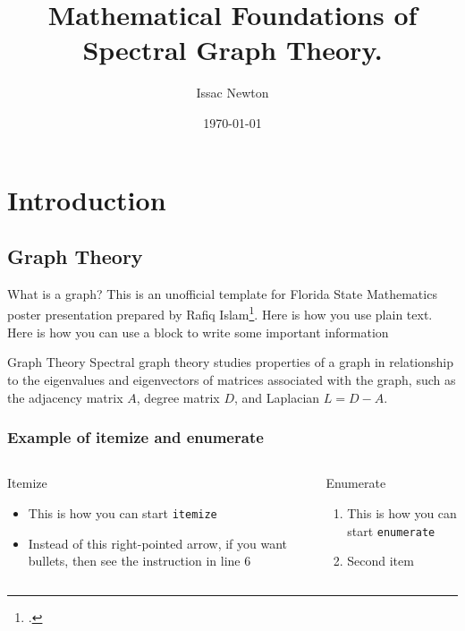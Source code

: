 \documentclass{ctexbeamer}
\title[A short version of the title goes here]{Mathematical Foundations of Spectral Graph Theory.}
\author[Newton]{Issac Newton}
\institute{Nanjing University}
\date{\today}
\begin{document}
\maketitle

\section{Introduction}
\subsection{Graph Theory}
\begin{frame}{What is a graph?}
    This is an unofficial template for Florida State Mathematics poster presentation prepared by Rafiq 
    Islam\footcite{fsumathposter25}. Here is how you use plain text. Here is how you can use a block to write some important information \cite{fsubeamerpresent25}
    \begin{block}{Graph Theory}
        Spectral graph theory studies properties of a graph in relationship to the eigenvalues and eigenvectors of matrices associated with the graph, such as the adjacency matrix $A$, degree matrix $D$, and Laplacian $L = D - A$.
    \end{block}
\end{frame}
\begin{frame}
    \frametitle{Example of itemize and enumerate}
    \begin{columns}[c, onlytextwidth]
        \begin{column}{0.48\textwidth}
            \begin{block}{Itemize}
                \begin{itemize}
                    \item This is how you can start \texttt{itemize}
                    \item Instead of this right-pointed arrow, if you want bullets, then see the instruction in line 6
                \end{itemize}
            \end{block}
        \end{column}
        \begin{column}{0.48\textwidth}
            \begin{block}{Enumerate}
                \begin{enumerate}
                    \item This is how you can start \texttt{enumerate}
                    \item Second item
                \end{enumerate}
            \end{block}
        \end{column}
    \end{columns}
\end{frame}
\end{document}
